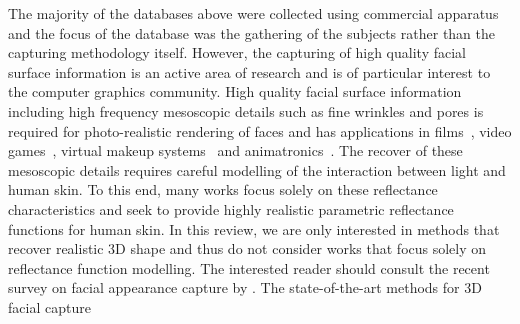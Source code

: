 The majority of the databases above were collected using commercial apparatus
and the focus of the database was the gathering of the subjects rather than the
capturing methodology itself. However, the capturing of high quality facial
surface information is an active area of research and is of particular interest
to the computer graphics community. High quality facial surface information
including high frequency mesoscopic details such as fine wrinkles and pores is
required for photo-realistic rendering of faces and has applications in
films~\cite{borshukov2005universal}, video games~\cite{vonderPahlen:2014kg},
virtual makeup systems~\cite{scherbaum2011computer} and
animatronics~\cite{jung2011believable}. The recover of these mesoscopic details
requires careful modelling of the interaction between light and human skin. To
this end, many works focus solely on these reflectance characteristics and seek
to provide highly realistic parametric reflectance functions for human skin. In
this review, we are only interested in methods that recover realistic 3D shape
and thus do not consider works that focus solely on reflectance function
modelling. The interested reader should consult the recent survey on facial
appearance capture by \citet{Klehm:2015jb}. The state-of-the-art methods
for 3D facial capture 
